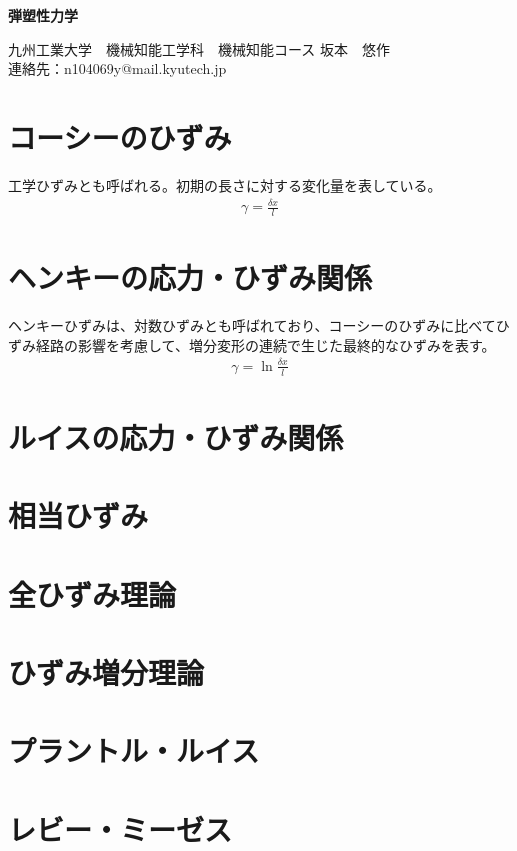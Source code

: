 \documentclass[a4j,twoside,openright,11pt]{jsarticle}
\begin{document}
\begin{screen}
\huge
\begin{center}
{\bf 弾塑性力学}\\
\end{center}

\normalsize
\begin{flushright}
九州工業大学　機械知能工学科　機械知能コース  坂本　悠作\\連絡先：n104069y@mail.kyutech.jp
\end{flushright}
\end{screen}

\section{コーシーのひずみ}
工学ひずみとも呼ばれる。初期の長さに対する変化量を表している。
\begin{eqnarray}
\gamma = \frac{\delta x}{l}
\end{eqnarray}
\section{ヘンキーの応力・ひずみ関係}
ヘンキーひずみは、対数ひずみとも呼ばれており、コーシーのひずみに比べてひずみ経路の影響を考慮して、増分変形の連続で生じた最終的なひずみを表す。
\begin{eqnarray}
\gamma = \ln \frac{\delta x}{l}
\end{eqnarray}
\section{ルイスの応力・ひずみ関係}
\section{相当ひずみ}
\section{全ひずみ理論}
\section{ひずみ増分理論}
\section{プラントル・ルイス}
\section{レビー・ミーゼス}
\end{document}
